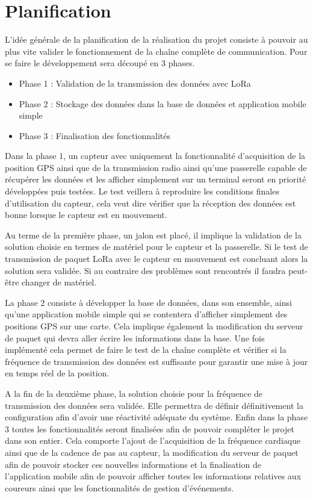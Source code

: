 \chapter{Planification}

L’idée générale de la planification de la réalisation du projet consiste à pouvoir au plus vite valider le fonctionnement de la chaîne complète de communication. Pour se faire le développement sera découpé en 3 phases.

\begin{itemize}
\item Phase 1 : Validation de la transmission des données avec LoRa
\item Phase 2 : Stockage des données dans la base de données et application mobile simple
\item Phase 3 : Finalisation des fonctionnalités
\end{itemize}

Dans la phase 1, un capteur avec uniquement la fonctionnalité d’acquisition de la position GPS ainsi que de la transmission radio ainsi qu’une passerelle capable de récupérer les données et les afficher simplement sur un terminal seront en priorité développées puis testées. Le test veillera à reproduire les conditions finales d’utilisation du capteur, cela veut dire vérifier que la réception des données est bonne lorsque le capteur est en mouvement.

Au terme de la première phase, un jalon est placé, il implique la validation de la solution choisie en termes de matériel pour le capteur et la passerelle. Si le test de transmission de paquet LoRa avec le capteur en mouvement est concluant alors la solution sera validée. Si au contraire des problèmes sont rencontrés il faudra peut-être changer de matériel.

La phase 2 consiste à développer la base de données, dans son ensemble, ainsi qu’une application mobile simple qui se contentera d’afficher simplement des positions GPS sur une carte. Cela implique également la modification du serveur de paquet qui devra aller écrire les informations dans la base. Une fois implémenté cela permet de faire le test de la chaîne complète et vérifier si la fréquence de transmission des données est suffisante pour garantir une mise à jour en temps réel de la position.

A la fin de la deuxième phase, la solution choisie pour la fréquence de transmission des données sera validée. Elle permettra de définir définitivement la configuration afin d’avoir une réactivité adéquate du système.
Enfin dans la phase 3 toutes les fonctionnalités seront finalisées afin de pouvoir compléter le projet dans son entier. Cela comporte l’ajout de l’acquisition de la fréquence cardiaque ainsi que de la cadence de pas au capteur, la modification du serveur de paquet afin de pouvoir stocker ces nouvelles informations et la finalisation de l’application mobile afin de pouvoir afficher toutes les informations relatives aux coureurs ainsi que les fonctionnalités de gestion d’événements.

